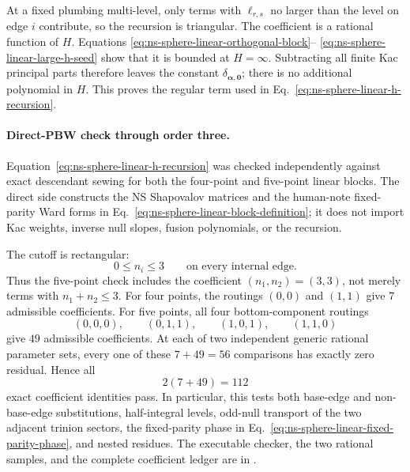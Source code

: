 \documentclass[11pt]{article}
\begin{document}
At a fixed plumbing multi-level, only terms with
\(\ell_{r,s}\) no larger than the level on edge \(i\) contribute, so the
recursion is triangular.  The coefficient is a rational function of \(H\).
Equations
\eqref{eq:ns-sphere-linear-orthogonal-block}--%
\eqref{eq:ns-sphere-linear-large-h-seed} show that it is bounded at
\(H=\infty\).  Subtracting all finite Kac principal parts therefore leaves
the constant
\(\delta_{\boldsymbol\alpha,\boldsymbol0}\); there is no additional
polynomial in \(H\).  This proves the regular term used in
Eq.~\eqref{eq:ns-sphere-linear-h-recursion}.

\paragraph{Direct-PBW check through order three.}
Equation~\eqref{eq:ns-sphere-linear-h-recursion} was checked independently
against exact descendant sewing for both the four-point and five-point
linear blocks.  The direct side constructs the NS Shapovalov matrices and
the human-note fixed-parity Ward forms in
Eq.~\eqref{eq:ns-sphere-linear-block-definition}; it does not import Kac
weights, inverse null slopes, fusion polynomials, or the recursion.

The cutoff is rectangular:
\begin{equation}
 0\leq n_i\leq3
 \qquad\text{on every internal edge}.
 \label{eq:ns-sphere-linear-order-three-domain}
\end{equation}
Thus the five-point check includes the coefficient
\((n_1,n_2)=(3,3)\), not merely terms with \(n_1+n_2\leq3\).
For four points, the routings \((0,0)\) and \((1,1)\) give \(7\)
admissible coefficients.  For five points, all four bottom-component
routings
\begin{equation}
 (0,0,0),\qquad(0,1,1),\qquad(1,0,1),\qquad(1,1,0)
 \label{eq:ns-sphere-linear-checked-routings}
\end{equation}
give \(49\) admissible coefficients.  At each of two independent generic
rational parameter sets, every one of these \(7+49=56\) comparisons has
exactly zero residual.  Hence all
\begin{equation}
 2(7+49)=112
 \label{eq:ns-sphere-linear-check-count}
\end{equation}
exact coefficient identities pass.  In particular, this tests both
base-edge and non-base-edge substitutions, half-integral levels, odd-null
transport of the two adjacent trinion sectors, the fixed-parity phase in
Eq.~\eqref{eq:ns-sphere-linear-fixed-parity-phase}, and nested residues.
The executable checker, the two rational samples, and the complete
coefficient ledger are in
.
\end{document}
